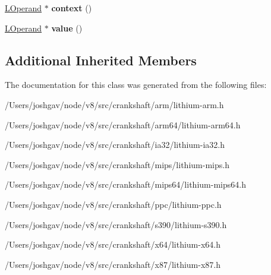 \begin{DoxyCompactItemize}
\item 
\hyperlink{classv8_1_1internal_1_1_l_operand}{L\+Operand} $\ast$ {\bfseries context} ()\hypertarget{classv8_1_1internal_1_1_l_math_abs_ad386c2425a0d0f9951dbd6478af688a6}{}\label{classv8_1_1internal_1_1_l_math_abs_ad386c2425a0d0f9951dbd6478af688a6}

\item 
\hyperlink{classv8_1_1internal_1_1_l_operand}{L\+Operand} $\ast$ {\bfseries value} ()\hypertarget{classv8_1_1internal_1_1_l_math_abs_ad13cf32d13c6dff6f8bb87b4a6e8439d}{}\label{classv8_1_1internal_1_1_l_math_abs_ad13cf32d13c6dff6f8bb87b4a6e8439d}

\end{DoxyCompactItemize}
\subsection*{Additional Inherited Members}


The documentation for this class was generated from the following files\+:\begin{DoxyCompactItemize}
\item 
/\+Users/joshgav/node/v8/src/crankshaft/arm/lithium-\/arm.\+h\item 
/\+Users/joshgav/node/v8/src/crankshaft/arm64/lithium-\/arm64.\+h\item 
/\+Users/joshgav/node/v8/src/crankshaft/ia32/lithium-\/ia32.\+h\item 
/\+Users/joshgav/node/v8/src/crankshaft/mips/lithium-\/mips.\+h\item 
/\+Users/joshgav/node/v8/src/crankshaft/mips64/lithium-\/mips64.\+h\item 
/\+Users/joshgav/node/v8/src/crankshaft/ppc/lithium-\/ppc.\+h\item 
/\+Users/joshgav/node/v8/src/crankshaft/s390/lithium-\/s390.\+h\item 
/\+Users/joshgav/node/v8/src/crankshaft/x64/lithium-\/x64.\+h\item 
/\+Users/joshgav/node/v8/src/crankshaft/x87/lithium-\/x87.\+h\end{DoxyCompactItemize}
